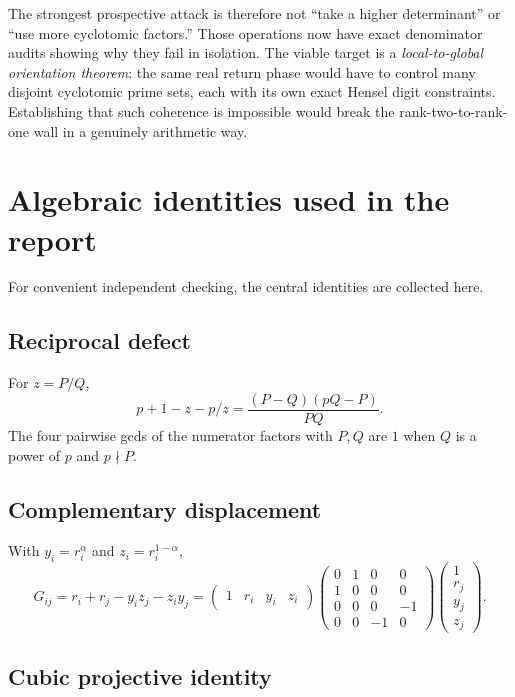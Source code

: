 \documentclass[11pt]{article}
\theoremstyle{definition}
\theoremstyle{remark}
\begin{document}
The strongest prospective attack is therefore not ``take a higher determinant'' or ``use more cyclotomic factors.''  Those operations now have exact denominator audits showing why they fail in isolation.  The viable target is a \emph{local-to-global orientation theorem}: the same real return phase would have to control many disjoint cyclotomic prime sets, each with its own exact Hensel digit constraints.  Establishing that such coherence is impossible would break the rank-two-to-rank-one wall in a genuinely arithmetic way.

\appendix

\section{Algebraic identities used in the report}
\label{app:identities}

For convenient independent checking, the central identities are collected here.

\subsection{Reciprocal defect}

For $z=P/Q$,
\[
 p+1-z-p/z
 =\frac{(P-Q)(pQ-P)}{PQ}.
\]
The four pairwise gcds of the numerator factors with $P,Q$ are $1$ when $Q$ is a power of $p$ and $p\nmid P$.

\subsection{Complementary displacement}

With $y_i=r_i^\alpha$ and $z_i=r_i^{1-\alpha}$,
\[
 G_{ij}=r_i+r_j-y_iz_j-z_iy_j
 =\begin{pmatrix}1&r_i&y_i&z_i\end{pmatrix}
 \begin{pmatrix}
 0&1&0&0\\
 1&0&0&0\\
 0&0&0&-1\\
 0&0&-1&0
 \end{pmatrix}
 \begin{pmatrix}1\\r_j\\y_j\\z_j\end{pmatrix}.
\]

\subsection{Cubic projective identity}
\end{document}
